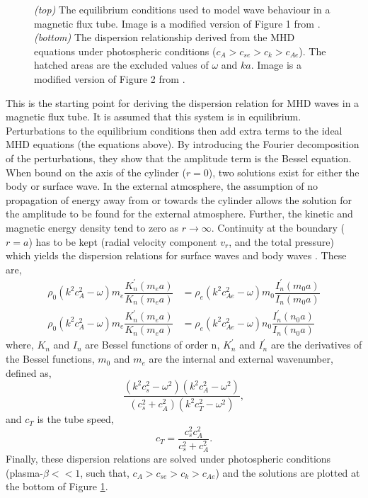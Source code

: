 \begin{figure}
\begin{subfigure}[b]{0.65\textwidth}
        \end{subfigure}
        \caption{
                \textit{(top)} The equilibrium conditions used to model wave behaviour in a magnetic flux tube.
                Image is a modified version of Figure 1 from \cite{WPMC}.
                \textit{(bottom)} The dispersion relationship derived from the MHD equations under photospheric conditions ($c_A > c_{se} > c_k > c_{Ae} $).
                The hatched areas are the excluded  values of $\omega$ and $ka$.
                Image is a modified version of Figure 2 from \cite{WPMC}.
                }
        \label{fig:fluxtube}
    \end{figure}
    
    This is the starting point for deriving the dispersion relation for MHD waves in a magnetic flux tube.
    It is assumed that this system is in equilibrium.
    Perturbations to the equilibrium conditions then add extra terms to the ideal MHD equations (the equations above).
    By introducing the Fourier decomposition of the perturbations, they show that the amplitude term is the Bessel equation.
    When bound on the axis of the cylinder ($r=0$), two solutions exist for either the body or surface wave.
    In the external atmosphere, the assumption of no propagation of energy away from or towards the cylinder allows the solution for the amplitude to be found for the external atmosphere.
    Further, the kinetic and magnetic energy density tend to zero as $r\rightarrow\infty$.
    Continuity at the boundary ($r=a$) has to be kept (radial velocity component $v_r$, and the total pressure) which yields the dispersion relations for surface waves and body waves \citep{WPMC}.
    These are,
    \begin{align}
        \rho_0 (k^2 c_A^2 - \omega)m_e \dfrac{K_n^\prime(m_e a)}{K_n(m_e a)} &= \rho_e (k^2 c_{Ae}^2 - \omega)m_0 \dfrac{I_n^\prime(m_0 a)}{I_n(m_0 a)} \tag{Surface, m$_0^2 > 0$} \\
        \rho_0 (k^2 c_A^2 - \omega)m_e \dfrac{K_n^\prime(m_e a)}{K_n(m_e a)} &= \rho_e (k^2 c_{Ae}^2 - \omega)n_0 \dfrac{I_n^\prime(n_0 a)}{I_n(n_0 a)} \tag{Body, m$_0^2 = -n_0 < 0$} 
    \end{align}
    where, $K_n$ and $I_n$ are Bessel functions of order n, $K_n^\prime$ and $I_n^\prime$ are the derivatives of the Bessel functions, $m_0$ and $m_e$ are the internal and external wavenumber, defined as, $$\dfrac{(k^2 c_{s}^2 - \omega^2)(k^2 c_{A}^2 - \omega^2)}{(c_{s}^2 + c_{A}^2)(k^2 c_{T}^2 - \omega^2)},$$ and $c_{T}$ is the tube speed, $$c_{T} = \dfrac{c_s^2 c_A^2}{c_s^2 + c_A^2}.$$
    Finally, these dispersion relations are solved under photospheric conditions (plasma-$\beta << 1$, such that, $c_A > c_{se} > c_k > c_{Ae} $) and the solutions are plotted at the bottom of Figure \ref{fig:fluxtube}.
        
